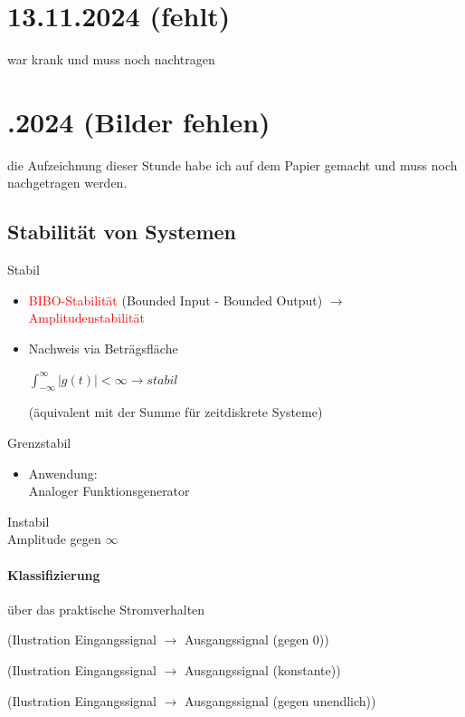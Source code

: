 \documentclass{article}
\begin{document}
\newpage
\section*{13.11.2024 (fehlt)}
war krank und muss noch nachtragen


\newpage
\section*{.2024 (Bilder fehlen)}
die Aufzeichnung dieser Stunde habe ich auf dem Papier gemacht und muss noch nachgetragen werden.
\subsection*{Stabilität von Systemen}
\begin{paracol}{3}
	{\large Stabil}
	\begin{itemize}
		\item \textcolor{red}{BIBO-Stabilität} (Bounded Input - Bounded Output) $\to$ \textcolor{red}{Amplitudenstabilität}
		\item Nachweis via Beträgsfläche
		\begin{center}
			$\int_{-\infty}^{\infty}|g(t)| < \infty \rightarrow stabil$
		\end{center}
		(äquivalent mit der Summe für zeitdiskrete Systeme)
	\end{itemize}

\switchcolumn
	{\large Grenzstabil}
	\begin{itemize}
		\item Anwendung: \\
		Analoger Funktionsgenerator
	\end{itemize}

\switchcolumn
	{\large Instabil} \\
	Amplitude gegen $\infty$
\end{paracol}

\paragraph{Klassifizierung} über das praktische Stromverhalten \\
\begin{paracol}{3}
	(Ilustration Eingangssignal $\to$ Ausgangssignal (gegen 0))

	\switchcolumn
	(Ilustration Eingangssignal $\to$ Ausgangssignal (konstante))

	\switchcolumn
	(Ilustration Eingangssignal $\to$ Ausgangssignal (gegen unendlich))
\end{paracol}
\end{document}
